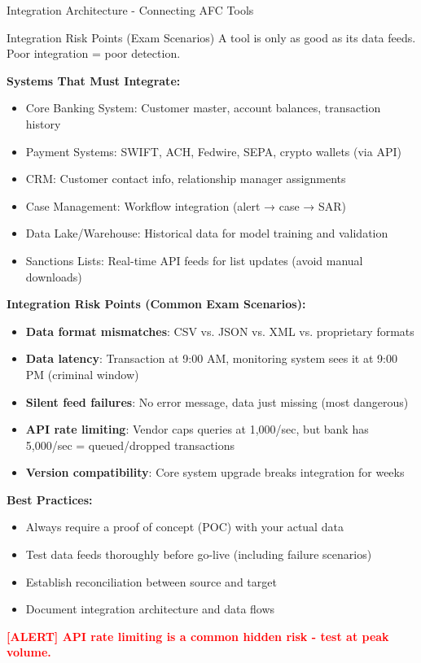 \documentclass[11pt,a4paper]{beamer}
\newcommand{\redflag}[1]{\textcolor{red}{\textbf{[ALERT] #1}}}
\begin{document}
\begin{frame}{Integration Architecture - Connecting AFC Tools}
	\begin{block}{Integration Risk Points (Exam Scenarios)}
		A tool is only as good as its data feeds. Poor integration = poor detection.
	\end{block}
	\textbf{Systems That Must Integrate:}
	\begin{itemize}
		\item Core Banking System: Customer master, account balances, transaction history
		\item Payment Systems: SWIFT, ACH, Fedwire, SEPA, crypto wallets (via API)
		\item CRM: Customer contact info, relationship manager assignments
		\item Case Management: Workflow integration (alert → case → SAR)
		\item Data Lake/Warehouse: Historical data for model training and validation
		\item Sanctions Lists: Real-time API feeds for list updates (avoid manual downloads)
	\end{itemize}
	\textbf{Integration Risk Points (Common Exam Scenarios):}
	\begin{itemize}
		\item \textbf{Data format mismatches}: CSV vs. JSON vs. XML vs. proprietary formats
		\item \textbf{Data latency}: Transaction at 9:00 AM, monitoring system sees it at 9:00 PM (criminal window)
		\item \textbf{Silent feed failures}: No error message, data just missing (most dangerous)
		\item \textbf{API rate limiting}: Vendor caps queries at 1,000/sec, but bank has 5,000/sec = queued/dropped transactions
		\item \textbf{Version compatibility}: Core system upgrade breaks integration for weeks
	\end{itemize}
	\textbf{Best Practices:}
	\begin{itemize}
		\item Always require a proof of concept (POC) with your actual data
		\item Test data feeds thoroughly before go-live (including failure scenarios)
		\item Establish reconciliation between source and target
		\item Document integration architecture and data flows
	\end{itemize}
	\redflag{API rate limiting is a common hidden risk - test at peak volume.}
\end{frame}
\end{document}
